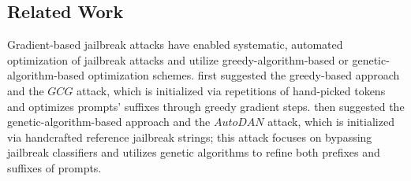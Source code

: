 





\subsection{Related Work}
\label{subsec:related}
Gradient-based jailbreak attacks have enabled systematic, automated optimization of jailbreak attacks and utilize greedy-algorithm-based \cite{jia2024improved,yu2024enhancing,mehrotra2023tree} or genetic-algorithm-based \cite{liu2023autodan,liu2024autodan,zhao2024accelerating} optimization schemes. \citet{zou2023universal} first suggested the greedy-based approach and the $GCG$ attack, which is initialized via repetitions of hand-picked tokens and optimizes prompts' suffixes through greedy gradient steps. \citet{liu2023autodan} then suggested the genetic-algorithm-based approach and the $AutoDAN$ attack, which is initialized via handcrafted reference jailbreak strings; this attack focuses on bypassing jailbreak classifiers and utilizes genetic algorithms to refine both prefixes and suffixes of prompts. 

